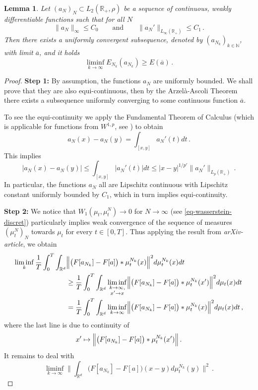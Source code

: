 \documentclass[A4paper,11pt]{article}
\newtheorem{lemma}[theorem]{Lemma}
\theoremstyle{definition}
\newcommand{\R}{\mathbb{R}}
\begin{document}
\begin{lemma}\label{lemma-semicontinuous-1}
	Let $(a_N)_N\subset L_2(\R_+,\rho)$ be a sequence of continuous, weakly differentiable functions such that for all
	$N$
	\[
		\|a_N\|_\infty\leq C_0\qquad\text{and}\qquad\|a_N'\|_{L_\infty(\R_+)}\leq C_1\,.
	\]	
	Then there exists a uniformly convergent subsequence, denoted by $(a_{N_k})_{k \in \mathbb N}$, with limit 
	$\overline a$, and it holds
	\begin{equation}\label{eq-lower-semi}
		\liminf_{k\rightarrow\infty}E_{N_k}(a_{N_k})\geq E(\overline a)\,.
	\end{equation}
\end{lemma}

\begin{proof}
	{\bf Step 1:} By assumption, the functions $a_N$ are uniformly bounded. We shall prove that they are also
	equi-continuous, then by the Arzel\`a-Ascoli Theorem there exists a subsequence uniformly converging to some
	continuous function $\overline a$.
	
	To see the equi-continuity we apply the Fundamental Theorem of Calculus (which is applicable for functions from
	$W^{1,p}$, see \cite[Theorem 2.8]{AmbrosioFuscoPallara}) to obtain
	\[
		a_N(x)-a_N(y)=\int_{[x,y]}a_N'(t)dt\,.
	\]
	This implies
	\[
		\bigl|a_N(x)-a_N(y)\bigr|\leq\int_{[x,y]}|a_N'(t)|dt
			\leq |x-y|^{1/p'}\|a_N'\|_{L_p(\R_+)}\,.
	\]
	In particular, the functions $a_N$ all are Lipschitz continuous with Lipschitz constant uniformly bounded by
	$C_1$, which in turn implies equi-continuity.
	
	{\bf Step 2:} We notice that $W_1(\mu_t,\mu_t^N)\rightarrow 0$ for $N\rightarrow\infty$
	(see \eqref{eq-wasserstein-discret}) particularly implies weak convergence of the sequence of measures
	$(\mu_t^N)_N$ towards $\mu_t$ for every $t\in [0,T]$. Thus applying the result from {\it arXiv-article}, we obtain
	\begin{align*}
		\liminf_k\frac{1}{T}\int_0^T\int_{\R^d}
			&\Bigl\|\bigl(F[a_{N_k}]-F[a]\bigr)\ast\mu_t^{N_k}(x)\Bigr\|^2 d\mu_t^{N_k}(x) dt\\
			&\geq\frac{1}{T}\int_0^T \int_{\R^d} \liminf_{\substack{k\rightarrow\infty,\\x'\rightarrow x}}
				\Bigl\|\bigl(F[a_{N_k}]-F[a]\bigr)\ast\mu_t^{N_k}(x')\Bigr\|^2 d\mu_t(x) dt\\
			&=\frac{1}{T}\int_0^T\int_{\R^d}\liminf_{k\rightarrow\infty}
				\Bigl\|\bigl(F[a_{N_k}]-F[a]\bigr)\ast\mu_t^{N_k}(x)\Bigr\|^2 d\mu_t(x) dt\,,\\
	\end{align*}
	where the last line is due to continuity of
	\begin{equation*}
		x'\mapsto\Bigl\|\bigl(F[a_{N_k}]-F[a]\bigr)\ast\mu_t^{N_k}(x')\Bigr\|\,.
	\end{equation*}
	It remains to deal with
	\begin{equation*}
		\liminf_{k\rightarrow\infty}
			\Biggl\|\int_{\R^d}\bigl(F[a_{N_k}]-F[a]\bigr)(x-y)d\mu_t^{N_k}(y)\Biggr\|^2\,.
	\end{equation*}
	

\end{proof}
\end{document}
